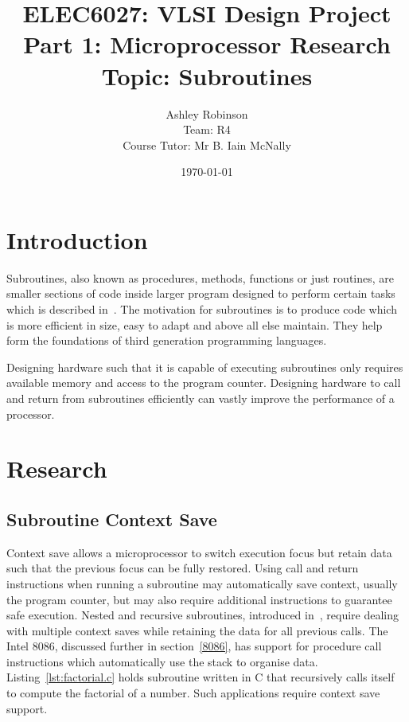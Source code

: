 \documentclass[12pt,a4paper]{article}
\title{ELEC6027: VLSI Design Project \\Part 1: Microprocessor Research\\Topic: Subroutines}
\author{Ashley Robinson\\ Team: R4\\Course Tutor: Mr B. Iain McNally}
\date{\today}
\begin{document}
\begin{titlepage}
\maketitle
\end{titlepage}

\tableofcontents
\clearpage

\lstset{
   frame=L,
   basicstyle=\footnotesize,        %
   captionpos=b
}


\section{Introduction}

Subroutines, also known as procedures, methods, functions or just routines, are smaller sections of code inside larger program designed to perform certain tasks which is described in~\cite{alison}.
The motivation for subroutines is to produce code which is more efficient in size, easy to adapt and above all else maintain. 
They help form the foundations of third generation programming languages.

Designing hardware such that it is capable of executing subroutines only requires available memory and access to the program counter.
Designing hardware to call and return from subroutines efficiently can vastly improve the performance of a processor. 


\section{Research}

\subsection{Subroutine Context Save }
Context save allows a microprocessor to switch execution focus but retain data such that the previous focus can be fully restored.
Using call and return instructions when running a subroutine may automatically save context, usually the program counter, but may also require additional instructions to guarantee safe execution.
Nested and recursive subroutines, introduced in~\cite{IainPrograms}, require dealing with multiple context saves while retaining the data for all previous calls. 
The Intel 8086, discussed further in section~\ref{8086}, has support for procedure call instructions which automatically use the stack to organise data.
Listing~\ref{lst:factorial.c} holds subroutine written in C that recursively calls itself to compute the factorial of a number.
Such applications require context save support.
\end{document}
